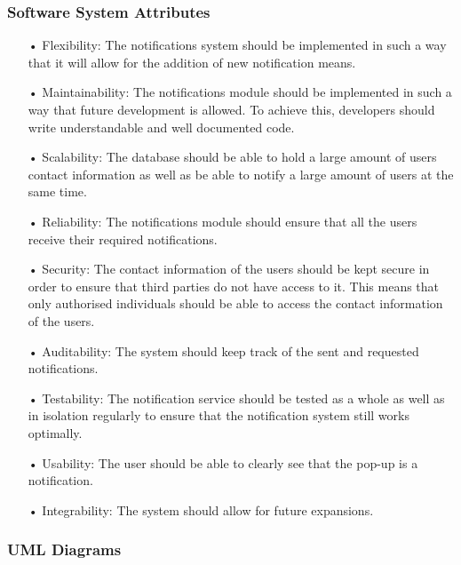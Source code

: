 \documentclass[runningheads,a4paper]{article}
\begin{document}
\subsubsection{Software System Attributes}
\begin{enumerate}

\item[•] Flexibility: The notifications system should be implemented in such a way that it will allow for the addition of new notification means.

\item[•]Maintainability: The notifications module should be implemented in such a way that future development is allowed. To achieve this, developers should write understandable and well documented code.
 
\item[•]Scalability: The database should be able to hold a large amount of users contact information as well as be able to notify a large amount of users at the same time.

\item[•]Reliability: The notifications module should ensure that all the users receive their required notifications.

\item[•]Security: The contact information of the users should be kept secure in order to ensure that third parties do not have access to it. This means that only authorised individuals should be able to access the contact information of the users.

\item[•]Auditability: The system should keep track of the sent and requested notifications.

\item[•]Testability: The notification service should be tested as a whole as well as in isolation regularly to ensure that the notification system still works optimally.

\item[•]Usability: The user should be able to clearly see that the pop-up is a notification.

\item[•]Integrability: The system should allow for future expansions.

\end{enumerate}



\subsubsection{UML Diagrams}
\end{document}
